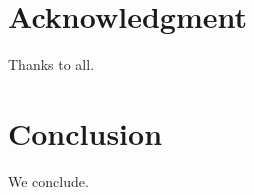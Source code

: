 \documentclass{article}
\begin{document}
\section{Acknowledgment}
Thanks to all.
\section{Conclusion}
We conclude.
\end{document}
